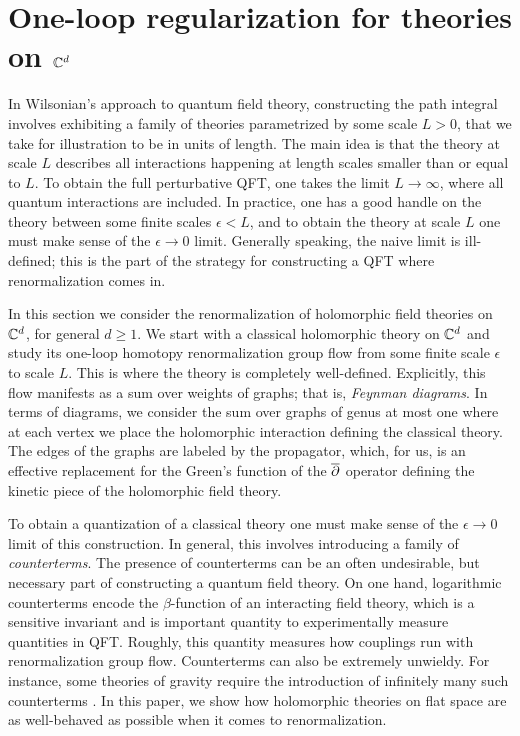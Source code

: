 \documentclass[11pt]{amsart}
\begin{document}
\section{One-loop regularization for theories on $\mathbb C^d$} \label{sec: hol renorm}

In Wilsonian's approach to quantum field theory, constructing the path integral involves exhibiting a family of theories parametrized by some scale $L > 0$, that we take for illustration to be in units of length. 
The main idea is that the theory at scale $L$ describes all interactions happening at length scales smaller than or equal to $L$. 
To obtain the full perturbative QFT, one takes the limit $L \to \infty$, where all quantum interactions are included. 
In practice, one has a good handle on the theory between some finite scales $\epsilon < L$, and to obtain the theory at scale $L$ one must make sense of the $\epsilon \to 0$ limit. 
Generally speaking, the naive limit is ill-defined; this is the part of the strategy for constructing a QFT where renormalization comes in. 

In this section we consider the renormalization of holomorphic field theories on $\mathbb C^d$, for general $d \geq 1$. 
We start with a classical holomorphic theory on $\mathbb C^d$ and study its one-loop homotopy renormalization group flow from some finite scale $\epsilon$ to scale $L$.
This is where the theory is completely well-defined. 
Explicitly, this flow manifests as a sum over weights of graphs; that is, {\em Feynman diagrams}.
In terms of diagrams, we consider the sum over graphs of genus at most one where at each vertex we place the holomorphic interaction defining the classical theory.
The edges of the graphs are labeled by the propagator, which, for us, is an effective replacement for the Green's function of the $\overline{\partial}$ operator defining the kinetic piece of the holomorphic field theory.

To obtain a quantization of a classical theory one must make sense of the $\epsilon \to 0$ limit of this construction. 
In general, this involves introducing a family of {\em counterterms}.
The presence of counterterms can be an often undesirable, but necessary part of constructing a quantum field theory.
On one hand, logarithmic counterterms encode the $\beta$-function of an interacting field theory, which is a sensitive invariant and is important quantity to experimentally measure quantities in QFT.
Roughly, this quantity measures how couplings run with renormalization group flow. 
Counterterms can also be extremely unwieldy. 
For instance, some theories of gravity require the introduction of infinitely many such counterterms \cite{THooftVelt}.
In this paper, we show how holomorphic theories on flat space are as well-behaved as possible when it comes to renormalization. 
\end{document}
